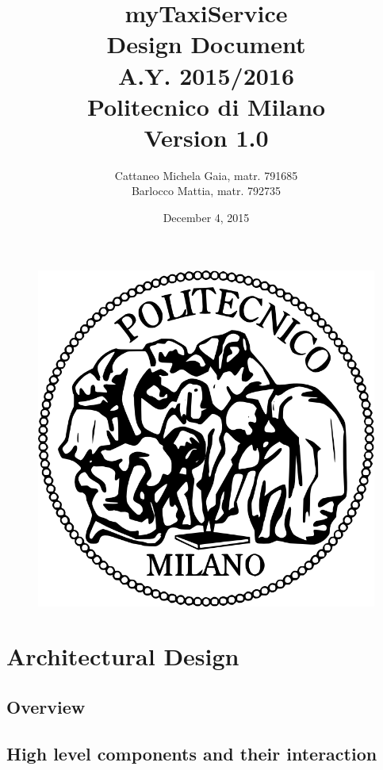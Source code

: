 \documentclass[18pt,oneside,a4paper, titlepage]{article}
\begin{document}
\begin{figure}[t]
	\centering
	\includegraphics[scale=0.35]{logo-polimi.png}
\end{figure}
\title{\textbf{myTaxiService}\\\textbf{D}esign \textbf{D}ocument\\ A.Y. 2015/2016\\
	Politecnico di Milano \\ Version 1.0}	
\author{Cattaneo Michela Gaia, matr. 791685\\Barlocco Mattia, matr. 792735 }
\date{December 4, 2015}
\maketitle

\newpage
	\tableofcontents
\newpage
	
		
	\section{Architectural Design}
		\subsection{Overview}
		\subsection{High level components and their interaction}
\end{document}
